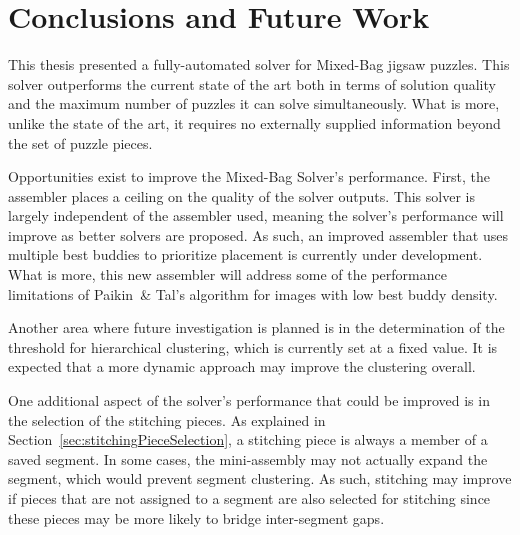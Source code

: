 \chapter{Conclusions and Future Work}

This thesis presented a fully-automated solver for Mixed-Bag jigsaw puzzles.  This solver outperforms the current state of the art both in terms of solution quality and the maximum number of puzzles it can solve simultaneously.  What is more, unlike the state of the art, it requires no externally supplied information beyond the set of puzzle pieces.

Opportunities exist to improve the Mixed-Bag Solver's performance.  First, the assembler places a ceiling on the quality of the solver outputs.  This solver is largely independent of the assembler used, meaning the solver's performance will improve as better solvers are proposed. As such, an improved assembler that uses multiple best buddies to prioritize placement is currently under development.  What is more, this new assembler will address some of the performance limitations of Paikin~\& Tal's algorithm for images with low best buddy density.

Another area where future investigation is planned is in the determination of the threshold for hierarchical clustering, which is currently set at a fixed value.  It is expected that a more dynamic approach may improve the clustering overall.

One additional aspect of the solver's performance that could be improved is in the selection of the stitching pieces.  As explained in Section~\ref{sec:stitchingPieceSelection}, a stitching piece is always a member of a saved segment.  In some cases, the mini-assembly may not actually expand the segment, which would prevent segment clustering.  As such, stitching may improve if pieces that are not assigned to a segment are also selected for stitching since these pieces may be more likely to bridge inter-segment gaps.